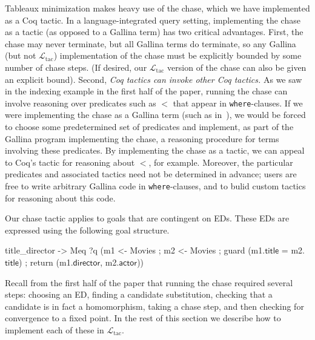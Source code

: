 \documentclass[preprint]{sigplanconf}
\newcommand{\ltac}[0]{\ensuremath{\mathcal{L}_{\mathrm{tac}}}}
\begin{document}
Tableaux minimization makes heavy use of the chase, which we have implemented as a Coq tactic.  In a language-integrated query setting, implementing the chase as a tactic (as opposed to a Gallina term) has two critical advantages.  First, the chase may never terminate, but all Gallina terms do terminate, so any Gallina (but not \ltac{}) implementation of the chase must be explicitly bounded by some number of chase steps. (If desired, our \ltac{} version of the chase can also be given an explicit bound). Second, {\it Coq tactics can invoke other Coq tactics.}  As we saw in the indexing example in the first half of the paper, running the chase can involve reasoning over predicates such as $<$ that appear in {\tt where}-clauses.
If we were implementing the chase as a Gallina term (such as in~\cite{coqdb}), we would be forced to choose some predetermined set of predicates and implement, as part of the Gallina program implementing the chase, a reasoning procedure for terms involving these predicates.  By implementing the chase as a tactic, we can appeal to Coq's  tactic for reasoning about $<$, for example.  Moreover, the particular predicates and associated tactics need not be determined in advance; users are free to write arbitrary Gallina code in {\tt where}-clauses, and to bulid custom tactics for reasoning about this code.


Our chase tactic applies to goals that are contingent on EDs.
These EDs are expressed using the following goal structure.
\begin{coq}
title_director ->
Meq ?q
    (m1 <- Movies ; m2 <- Movies ;
     guard (m1.$\textsf{title}$ = m2.$\textsf{title}$) ;
     return (m1.$\textsf{director}$, m2.$\textsf{actor}$))
\end{coq}

Recall from the first half of the paper that running the chase required several steps: choosing an ED, finding a candidate substitution, checking that a candidate is in fact a homomorphism, taking a chase step, and then checking for convergence to a fixed point.
In the rest of this section we describe how to implement each of these in \ltac{}.

\end{document}
